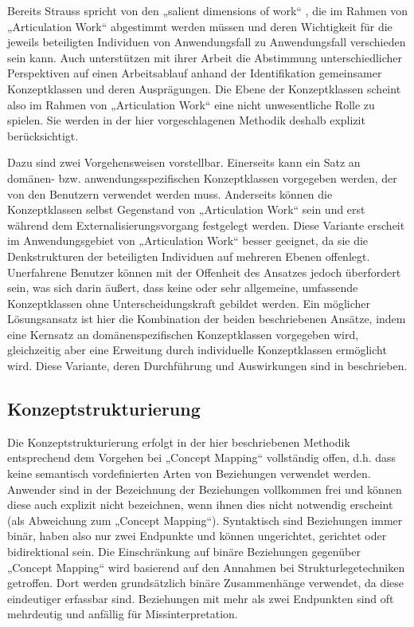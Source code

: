 Bereits Strauss spricht von den „salient dimensions of work“ \citep[][S.5]{Fjuk97}, die im Rahmen von „Articulation Work“ abgestimmt werden müssen und deren Wichtigkeit für die jeweils beteiligten Individuen von Anwendungsfall zu Anwendungsfall verschieden sein kann. Auch \citet{Sarini02} unterstützen mit ihrer Arbeit die Abstimmung unterschiedlicher Perspektiven auf einen Arbeitsablauf anhand der Identifikation gemeinsamer Konzeptklassen und deren Ausprägungen. Die Ebene der Konzeptklassen scheint also im Rahmen von „Articulation Work“ eine nicht unwesentliche Rolle zu spielen. Sie werden in der hier vorgeschlagenen Methodik deshalb explizit berücksichtigt. 

Dazu sind zwei Vorgehensweisen vorstellbar. Einerseits kann ein Satz an domänen- bzw. anwendungsspezifischen Konzeptklassen vorgegeben werden, der von den Benutzern verwendet werden muss. Anderseits können die Konzeptklassen selbst Gegenstand von „Articulation Work“ sein und erst während dem Externalisierungsvorgang festgelegt werden. Diese Variante erscheit im Anwendungsgebiet von „Articulation Work“ besser geeignet, da sie die Denkstrukturen der beteiligten Individuen auf mehreren Ebenen offenlegt. Unerfahrene Benutzer können mit der Offenheit des Ansatzes jedoch überfordert sein, was sich darin äußert, dass keine oder sehr allgemeine, umfassende Konzeptklassen ohne Unterscheidungskraft gebildet werden. Ein möglicher Lösungsansatz ist hier die Kombination der beiden beschriebenen Ansätze, indem eine Kernsatz an domänenspezifischen Konzeptklassen vorgegeben wird, gleichzeitig aber eine Erweitung durch individuelle Konzeptklassen ermöglicht wird. Diese Variante, deren Durchführung und Auswirkungen sind in \citet{Oppl05} beschrieben. 

\subsection{Konzeptstrukturierung}

Die Konzeptstrukturierung erfolgt in der hier beschriebenen Methodik entsprechend dem Vorgehen bei „Concept Mapping“ vollständig offen, d.h. dass keine semantisch vordefinierten Arten von Beziehungen verwendet werden. Anwender sind in der Bezeichnung der Beziehungen vollkommen frei und können diese auch explizit nicht bezeichnen, wenn ihnen dies nicht notwendig erscheint (als Abweichung zum „Concept Mapping“). Syntaktisch sind Beziehungen immer binär, haben also nur zwei Endpunkte und können ungerichtet, gerichtet oder bidirektional sein. Die Einschränkung auf binäre Beziehungen gegenüber „Concept Mapping“ wird basierend auf den Annahmen bei Strukturlegetechniken getroffen. Dort werden grundsätzlich binäre Zusammenhänge verwendet, da diese eindeutiger erfassbar sind. Beziehungen mit mehr als zwei Endpunkten sind oft mehrdeutig und anfällig für Missinterpretation.

